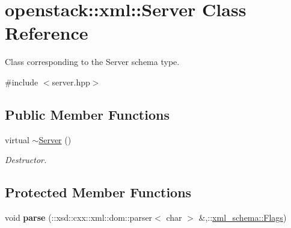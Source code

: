 \hypertarget{classopenstack_1_1xml_1_1Server}{
\section{openstack::xml::Server Class Reference}
\label{classopenstack_1_1xml_1_1Server}
}


Class corresponding to the Server schema type.  




{\ttfamily \#include $<$server.hpp$>$}

\subsection*{Public Member Functions}
\begin{DoxyCompactItemize}
\item 
\hypertarget{classopenstack_1_1xml_1_1Server_adec5eaae9cae7486f73600caaa7b3f15}{
virtual \hyperlink{classopenstack_1_1xml_1_1Server_adec5eaae9cae7486f73600caaa7b3f15}{$\sim$Server} ()}
\label{classopenstack_1_1xml_1_1Server_adec5eaae9cae7486f73600caaa7b3f15}

\begin{DoxyCompactList}\small\item\em Destructor. \item\end{DoxyCompactList}\end{DoxyCompactItemize}
\subsection*{Protected Member Functions}
\begin{DoxyCompactItemize}
\item 
\hypertarget{classopenstack_1_1xml_1_1Server_a567d3191564ecd05e6a6e8f9ad94b733}{
void {\bfseries parse} (::xsd::cxx::xml::dom::parser$<$ char $>$ \&,::\hyperlink{namespacexml__schema_affb4c227cbd9aa7453dd1dc5a1401943}{xml\_\-schema::Flags})}
\label{classopenstack_1_1xml_1_1Server_a567d3191564ecd05e6a6e8f9ad94b733}

\end{DoxyCompactItemize}
